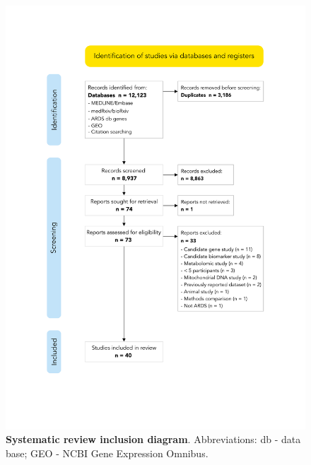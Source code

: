 \documentclass[
  11,
  a4paper,
]{article}
\begin{document}
\begin{figure}

{\centering \includegraphics{../img/Supplementary_Figure_1.png}

}

\caption{\textbf{Systematic review inclusion diagram}. Abbreviations: db
- data base; GEO - NCBI Gene Expression Omnibus.}

\end{figure}
\end{document}
